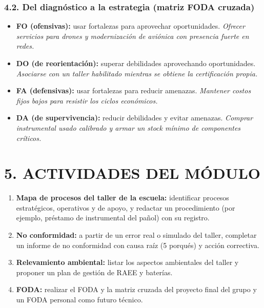 \subsubsection*{4.2. Del diagnóstico a la estrategia (matriz FODA cruzada)}
\begin{itemize}
  \item \textbf{FO (ofensivas):} usar fortalezas para aprovechar oportunidades. \textit{Ofrecer
        servicios para drones y modernización de aviónica con presencia fuerte en redes.}
  \item \textbf{DO (de reorientación):} superar debilidades aprovechando oportunidades.
        \textit{Asociarse con un taller habilitado mientras se obtiene la certificación propia.}
  \item \textbf{FA (defensivas):} usar fortalezas para reducir amenazas. \textit{Mantener costos
        fijos bajos para resistir los ciclos económicos.}
  \item \textbf{DA (de supervivencia):} reducir debilidades y evitar amenazas. \textit{Comprar
        instrumental usado calibrado y armar un stock mínimo de componentes críticos.}
\end{itemize}

\section*{5. ACTIVIDADES DEL MÓDULO}

\begin{enumerate}
  \item \textbf{Mapa de procesos del taller de la escuela:} identificar procesos estratégicos,
        operativos y de apoyo, y redactar un procedimiento (por ejemplo, préstamo de
        instrumental del pañol) con su registro.
  \item \textbf{No conformidad:} a partir de un error real o simulado del taller, completar un
        informe de no conformidad con causa raíz (5 porqués) y acción correctiva.
  \item \textbf{Relevamiento ambiental:} listar los aspectos ambientales del taller y proponer
        un plan de gestión de RAEE y baterías.
  \item \textbf{FODA:} realizar el FODA y la matriz cruzada del proyecto final del grupo y un
        FODA personal como futuro técnico.
\end{enumerate}
